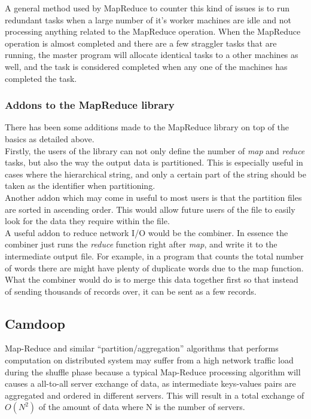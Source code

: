 \documentclass[]{article}
\begin{document}
A general method used by MapReduce to counter this kind of issues is to run redundant tasks when a large number of it's worker machines are idle and not processing anything related to the MapReduce operation. When the MapReduce operation is almost completed and there are a few straggler tasks that are running, the master program will allocate identical tasks to a other machines as well, and the task is considered completed when any one of the machines has completed the task. \\

\subsubsection{Addons to the MapReduce library}
There has been some additions made to the MapReduce library on top of the basics as detailed above.\\

Firstly, the users of the library can not only define the number of \emph{map} and \emph{reduce} tasks, but also the way the output data is partitioned. This is especially useful in cases where the hierarchical string, and only a certain part of the string should be taken as the identifier when partitioning.\\

Another addon which may come in useful to most users is that the partition files are sorted in ascending order. This would allow future users of the file to easily look for the data they require within the file. \\

A useful addon to reduce network I/O would be the combiner. In essence the combiner just runs the \emph{reduce} function right after \emph{map}, and write it to the intermediate output file. For example, in a program that counts the total number of words there are might have plenty of duplicate words due to the map function. What the combiner  would do is to merge this data together first so that instead of sending thousands of records over, it can be sent as a few records.\\

\subsection{Camdoop}

Map-Reduce and similar “partition/aggregation” algorithms that performs computation on distributed system may suffer from a high network traffic load during the shuffle phase because a typical Map-Reduce processing algorithm will causes a all-to-all server exchange of data, as intermediate keys-values pairs are aggregated and ordered in different servers. This will result in a total exchange of $O(N^2)$ of the amount of data where N is the number of servers.\\
\end{document}
